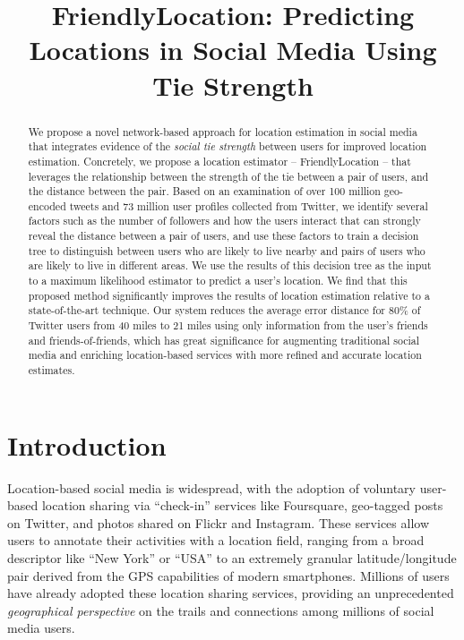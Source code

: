 \documentclass[letterpaper]{article}
\begin{document}
\title{FriendlyLocation: Predicting Locations in Social Media Using Tie Strength}

\maketitle
\begin{abstract}
We propose a novel network-based approach for location estimation in social media that integrates evidence of the \textit{social tie strength} between users for improved location estimation. Concretely, we propose a location estimator -- FriendlyLocation -- that leverages the relationship between the strength of the tie between a pair of users, and the distance between the pair. Based on an examination of over 100 million geo-encoded tweets and 73 million user profiles collected from Twitter, we identify several factors such as the number of followers and how the users interact that can strongly reveal the distance between a pair of users, and use these factors to train a decision tree to distinguish between users who are likely to live nearby and pairs of users who are likely to live in different areas. We use the results of this decision tree as the input to a maximum likelihood estimator to predict a user's location. We find that this proposed method significantly improves the results of location estimation relative to a state-of-the-art technique. Our system reduces the average error distance for 80\% of Twitter users from 40 miles to 21 miles using only information from the user's friends and friends-of-friends,  which has great significance for augmenting traditional social media and enriching location-based services with more refined and accurate location estimates.
\end{abstract}

\section{Introduction}
Location-based social media is widespread, with the adoption of voluntary user-based location sharing via ``check-in'' services like Foursquare, geo-tagged posts on Twitter, and photos shared on Flickr and Instagram. These services allow users to annotate their activities with a location field, ranging from a broad descriptor like ``New York'' or ``USA'' to an extremely granular latitude/longitude pair  derived from the GPS capabilities of modern smartphones. Millions of users have already adopted these location sharing services, providing an unprecedented \textit{geographical perspective} on the trails and connections among millions of social media users. 
\end{document}
